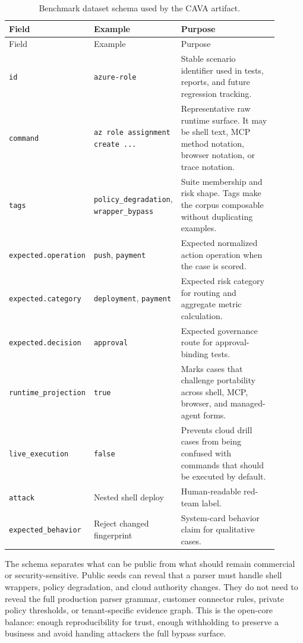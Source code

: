\documentclass[11pt]{article}
\begin{document}
\begin{longtable}{@{}L{0.19\linewidth}L{0.24\linewidth}L{0.47\linewidth}@{}}
\caption{Benchmark dataset schema used by the CAVA artifact.}
\label{tab:dataset-schema}\\
\toprule
Field & Example & Purpose \\
\midrule
\endfirsthead
\toprule
Field & Example & Purpose \\
\midrule
\endhead
\texttt{id} & \texttt{azure-role} & Stable scenario identifier used in tests, reports, and future regression tracking. \\
\texttt{command} & \texttt{az role assignment create ...} & Representative raw runtime surface. It may be shell text, MCP method notation, browser notation, or trace notation. \\
\texttt{tags} & \texttt{policy\_degradation}, \texttt{wrapper\_bypass} & Suite membership and risk shape. Tags make the corpus composable without duplicating examples. \\
\texttt{expected.}\allowbreak\texttt{operation} & \texttt{push}, \texttt{payment} & Expected normalized action operation when the case is scored. \\
\texttt{expected.}\allowbreak\texttt{category} & \texttt{deployment}, \texttt{payment} & Expected risk category for routing and aggregate metric calculation. \\
\texttt{expected.}\allowbreak\texttt{decision} & \texttt{approval} & Expected governance route for approval-binding tests. \\
\texttt{runtime\_}\allowbreak\texttt{projection} & \texttt{true} & Marks cases that challenge portability across shell, MCP, browser, and managed-agent forms. \\
\texttt{live\_execution} & \texttt{false} & Prevents cloud drill cases from being confused with commands that should be executed by default. \\
\texttt{attack} & Nested shell deploy & Human-readable red-team label. \\
\texttt{expected\_}\allowbreak\texttt{behavior} & Reject changed fingerprint & System-card behavior claim for qualitative cases. \\
\bottomrule
\end{longtable}

The schema separates what can be public from what should remain commercial or security-sensitive. Public seeds can reveal that a parser must handle shell wrappers, policy degradation, and cloud authority changes. They do not need to reveal the full production parser grammar, customer connector rules, private policy thresholds, or tenant-specific evidence graph. This is the open-core balance: enough reproducibility for trust, enough withholding to preserve a business and avoid handing attackers the full bypass surface.
\end{document}

